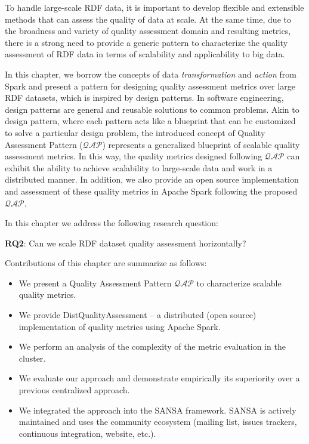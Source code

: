 To handle large-scale \gls{RDF} data, it is important to develop flexible and extensible methods that can assess the quality of data at scale. 
At the same time, due to the broadness and variety of quality assessment domain and resulting metrics, there is a strong need to provide a generic pattern to characterize the quality assessment of \gls{RDF} data in terms of scalability and applicability to big data.

In this chapter, we borrow the concepts of data \textit{transformation} and \textit{action} from Spark and present a pattern for designing quality assessment metrics over large \gls{RDF} datasets, which is inspired by design patterns.
In software engineering, design patterns are general and reusable solutions to common problems. 
Akin to design pattern, where each pattern acts like a blueprint that can be customized to solve a particular design problem, 
the introduced concept of Quality Assessment Pattern ($\mathcal{QAP}$) represents a generalized blueprint of scalable quality assessment metrics. 
In this way, the quality metrics designed following $\mathcal{QAP}$ can exhibit the ability to achieve scalability to large-scale data and work in a distributed manner.
In addition, we also provide an open source implementation and assessment of these quality metrics in Apache Spark following the proposed $\mathcal{QAP}$.

In this chapter we address the following research question:

\begin{tcolorbox}
\textbf{RQ2}: Can we scale \gls{RDF} dataset quality assessment horizontally?
\end{tcolorbox}

Contributions of this chapter are summarize as follows:
\begin{itemize}
    \item We present a Quality Assessment Pattern $\mathcal{QAP}$ to characterize scalable quality metrics.
    \item We provide DistQualityAssessment -- a distributed (open source) implementation of quality metrics using Apache Spark.
    \item We perform an analysis of the complexity of the metric evaluation in the cluster.
    \item We evaluate our approach and demonstrate empirically its superiority over a previous centralized approach.
    \item We integrated the approach into the SANSA framework.
    SANSA is actively maintained and uses the community ecosystem (mailing list, issues trackers, continuous integration, website, etc.).
\end{itemize}


